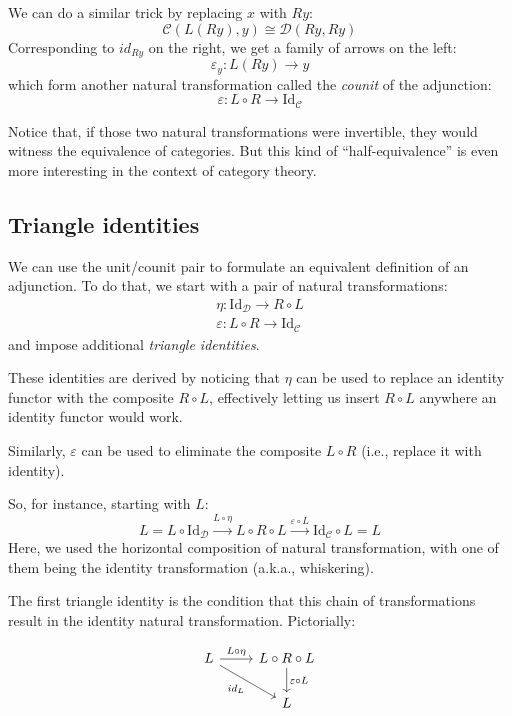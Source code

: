 \documentclass[DaoFP]{subfiles}
\begin{document}
We can do a similar trick by replacing $x$ with $R y$:
\[  \mathcal{C} (L (R y), y) \cong \mathcal{D}( R y , R y)\]
Corresponding to $id_{R y}$ on the right, we get a family of arrows on the left:
\[ \varepsilon_y \colon L (R y) \to y \]
which form another natural transformation called the \emph{counit} of the adjunction:
\[ \varepsilon \colon L \circ R \to \text{Id}_{\mathcal{C}}  \]

Notice that, if those two natural transformations were invertible, they would witness the equivalence of categories. But this kind of ``half-equivalence'' is even more interesting in the context of category theory. 

\subsection{Triangle identities}

We can use the unit/counit pair to formulate an equivalent  definition of an adjunction. To do that, we start with a pair of natural transformations:
\begin{align*}
\eta \colon \text{Id}_{\mathcal{D}} \to R \circ L \\
\varepsilon \colon L \circ R \to \text{Id}_{\mathcal{C}} 
\end{align*}
and impose additional \emph{triangle identities}. 

These identities are derived by noticing that $\eta$ can be used to replace an identity functor with the composite $R \circ L$, effectively letting us insert $R \circ L$ anywhere an identity functor would work.

Similarly, $\varepsilon$ can be used to eliminate the composite $L \circ R$ (i.e., replace it with identity). 

So, for instance, starting with $L$:
\[ L = L \circ \text{Id}_{\mathcal{D}} \xrightarrow{L \circ \eta} L \circ R \circ L \xrightarrow{\varepsilon \circ L} \text{Id}_{\mathcal{C}} \circ L = L \]
Here, we used the horizontal composition of natural transformation, with one of them being the identity transformation (a.k.a., whiskering).

The first triangle identity is the condition that this chain of transformations result in the identity natural transformation. Pictorially:

\[
 \begin{tikzcd}
 L
 \arrow[r, "L \circ \eta"]
 \arrow[rd, "id_L"']
 & L \circ R \circ L
 \arrow[d, "\varepsilon \circ L"]
 \\
 & L
  \end{tikzcd}
\]
\end{document}
